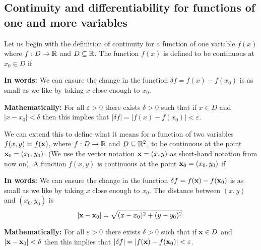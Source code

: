 \documentclass[10pt, a4paper]{article}
\begin{document}
\subsection{Continuity and differentiability for functions of one and more variables}
Let us begin with the definition of continuity for a function of one variable $f(x)$ where $f : D \rightarrow \mathbb{R}$ and $D \subseteq \mathbb{R}$.
The function $f(x)$ is defined to be continuous at $x_0 \in D$ if

\textbf{In words:}
We can ensure the change in the function $\delta f = f(x) - f(x_0)$ is as small as we like by taking $x$ close enough to $x_0$.

\textbf{Mathematically:}
For all $\varepsilon > 0$ there exists $\delta > 0$ such that if $x \in D$ and $|x - x_0| < \delta$ then this implies that $|\delta f| = |f(x) - f(x_0)| < \varepsilon$.

We can extend this to define what it means for a function of two variables $f(x, y) = f(\mathbf{x})$,
where $f : D \rightarrow \mathbb{R}$ and $D \subseteq \mathbb{R} ^ 2$,
to be continuous at the point $\mathbf{x}_0 = (x_0, y_0)$.
(We use the vector notation $\mathbf{x} = (x, y)$ as short-hand notation from now on).
A function $f(x, y)$ is continuous at the point $\mathbf{x}_0 = (x_0, y_0)$ if

\textbf{In words:}
We can ensure the change in the function $\delta f = f(\mathbf{x}) - f(\mathbf{x}_0)$ is as small as we like by taking $x$ close enough to $x_0$.
The distance between $(x, y)$ and $(x_0, y_0)$ is
\[
|\mathbf{x} - \mathbf{x}_0| = \sqrt{(x - x_0) ^ 2 + (y - y_0) ^ 2}.
\]

\textbf{Mathematically:}
For all $\varepsilon > 0$ there exists $\delta > 0$ such that if $\mathbf{x} \in D$ and $|\mathbf{x} - \mathbf{x}_0| < \delta$ then this implies that $|\delta f| = |f(\mathbf{x}) - f(\mathbf{x}_0)| < \varepsilon$.
\end{document}
